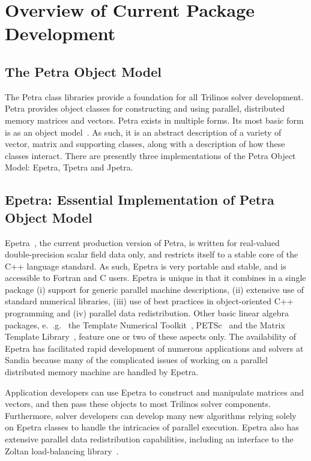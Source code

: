 \documentclass[12pt,relax]{SANDreport}
\begin{document}
\section{Overview of Current Package Development}
\label{sect:Software}

\subsection{The Petra Object Model}
\label{subsect:PetraObjectModel}
The Petra class libraries provide a
foundation for all Trilinos solver development.  Petra provides object classes for
constructing and using parallel, distributed memory matrices and vectors.  
Petra exists in
multiple forms.  Its most basic form is as an object model~\cite{HeroHoekWill2002}.
As such, it is an abstract 
description of a variety of vector, matrix and supporting classes, along with a 
description of
how these classes interact.  There are presently three implementations
of the Petra Object Model: Epetra, Tpetra and Jpetra.

\subsection{Epetra: Essential Implementation of Petra Object Model}

Epetra~\cite{Epetra-User-Guide}, the current production version of Petra,
 is written for real-valued double-precision scalar field data only, and
restricts itself to a stable core
of the C++ language standard.  As such, Epetra is very portable and stable, and  
is accessible to Fortran and C users.  
Epetra is unique in that it combines in a single package (i) support for generic parallel
machine descriptions, (ii) extensive use of standard numerical libraries, (iii) use of best
practices in object-oriented C++ programming and (iv) parallel data redistribution.
Other basic linear algebra packages, e.~.g.~ the Template Numerical Toolkit~\cite{TNT-site},
PETSc~\cite{petsc-manual} and the Matrix Template Library~\cite{SiekLums98}, feature one
or two of these aspects only.  The availability of Epetra has facilitated rapid development
of numerous applications and solvers at Sandia because many of the complicated issues of
working on a parallel distributed memory machine are handled by Epetra.

Application developers can use Epetra to construct and manipulate matrices
and vectors, and then pass these objects to most Trilinos solver components.  Furthermore,
solver developers can develop many new algorithms relying solely on Epetra classes to
handle the intricacies of parallel execution.  Epetra also has extensive parallel data  
redistribution capabilities, including an interface to the Zoltan load-balancing
library~\cite{zoltan-ug}.
\end{document}
